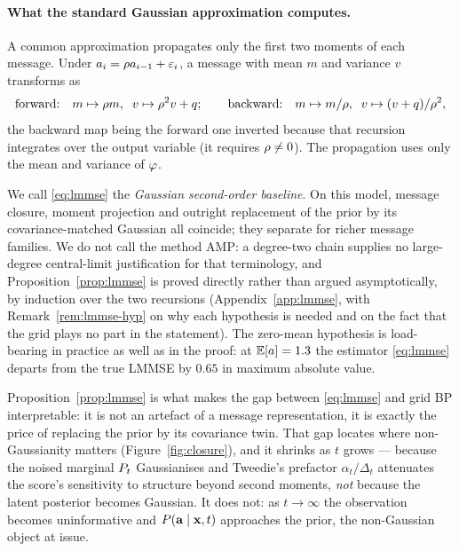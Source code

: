 \documentclass{article}
\theoremstyle{definition}
\theoremstyle{plain}
\begin{document}
\paragraph{What the standard Gaussian approximation computes.} A common approximation propagates
only the first two moments of each message. Under $a_i = \rho a_{i-1} + \varepsilon_i$, a message
with mean $m$ and variance $v$ transforms as
\begin{equation}
\label{eq:closure}
\text{forward:}\quad m \mapsto \rho m,\;\; v \mapsto \rho^2 v + q ;
\qquad
\text{backward:}\quad m \mapsto m/\rho,\;\; v \mapsto (v+q)/\rho^2 ,
\end{equation}
the backward map being the forward one inverted because that recursion integrates over the output
variable (it requires $\rho\neq0$). The propagation uses only the mean and variance of $\varphi$.



We call \eqref{eq:lmmse} the \emph{Gaussian second-order baseline}. On this model, message
closure, moment projection and outright replacement of the prior by its covariance-matched
Gaussian all coincide; they separate for richer message families. We do not call the method AMP: a
degree-two chain supplies no large-degree central-limit justification for that terminology, and
Proposition~\ref{prop:lmmse} is proved directly rather than argued asymptotically, by induction
over the two recursions (Appendix~\ref{app:lmmse}, with Remark~\ref{rem:lmmse-hyp} on why each
hypothesis is needed and on the fact that the grid plays no part in the statement). The zero-mean
hypothesis is load-bearing in practice as well as in the proof: at $\mathbb{E}[a]=1.3$ the estimator
\eqref{eq:lmmse} departs from the true LMMSE by $0.65$ in maximum absolute value.

Proposition~\ref{prop:lmmse} is what makes the gap between \eqref{eq:lmmse} and grid BP
interpretable: it is not an artefact of a message representation, it is exactly the price of
replacing the prior by its covariance twin. That gap locates where non-Gaussianity matters
(Figure~\ref{fig:closure}), and it shrinks as $t$ grows --- because the noised marginal $P_t$
Gaussianises and Tweedie's prefactor $\alpha_t/\Delta_t$ attenuates the score's sensitivity to
structure beyond second moments, \emph{not} because the latent posterior becomes Gaussian. It does
not: as $t\to\infty$ the observation becomes uninformative and $P(\mathbf{a}\mid\mathbf{x},t)$ approaches the
prior, the non-Gaussian object at issue.
\end{document}
